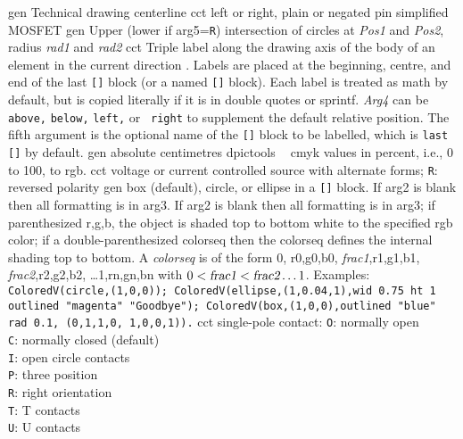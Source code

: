   {gen}%
  {Technical drawing centerline}%
%
  {cct}%
  {left or right, plain or negated pin simplified MOSFET}%
%
  {gen}%
  {Upper (lower if arg5={\tt R}) intersection of circles at
    {\sl Pos1} and {\sl Pos2}, radius {\sl rad1} and {\sl rad2}}%
%
  {cct}%
  {Triple label along the drawing axis of the body of an element in the
    current direction .  Labels are placed at the
    beginning, centre, and end of the last {\tt []} block (or a named
    {\tt []} block). Each label is treated as math by default, but is
    copied literally if it is in double quotes or sprintf.
    {\sl Arg4} can be {\tt above,} {\tt below,} {\tt left,} or {\tt
    right} to supplement the default relative position.  The fifth
    argument is the optional name of the {\tt []} block to be labelled,
    which is {\tt last []} by default.}%
%
  {gen}%
  {absolute centimetres}%
%
  {dpictools}%
  {$\;\;$ cmyk values in percent, i.e., 0 to 100, to rgb.}%
%
  {cct}%
  {voltage or current controlled source with alternate forms;
   {\tt R}: reversed polarity}%
%
  {gen}%
  {box (default), circle, or ellipse in a {\tt []} block.
   If arg2 is blank then all formatting is in arg3.  If arg2 is blank
   then all formatting is in arg3; if parenthesized r,g,b, the object
   is shaded top to bottom white to the specified rgb color; if a
   double-parenthesized colorseq then the colorseq defines the internal
   shading top to bottom.  A {\sl colorseq} is of the form
   0, r0,g0,b0, {\sl frac1},r1,g1,b1, {\sl frac2},r2,g2,b2,
   \ldots 1,rn,gn,bn with $0 < \hbox{\sl frac1} < \hbox{\sl frac2} \ldots 1$.
   Examples: {\tt ColoredV(circle,(1,0,0));
   ColoredV(ellipse,(1,0.04,1),wid 0.75 ht 1 outlined "magenta" "Goodbye");
   ColoredV(box,(1,0,0),outlined "blue" rad 0.1, (0,1,1,0, 1,0,0,1)).} }%
%
  {cct}%
  {single-pole contact:
   {\tt O}:  normally open\\
   {\tt C}: normally closed (default)\\
   {\tt I}: open circle contacts\\
   {\tt P}: three position\\
   {\tt R}: right orientation\\
   {\tt T}: T contacts\\
   {\tt U}: U contacts
   }%
